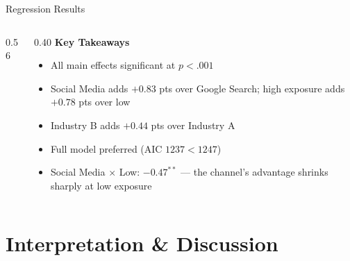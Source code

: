 \documentclass[aspectratio=169, 10pt]{beamer}
\begin{document}
\begin{frame}{Regression Results}
\begin{columns}[T]
\begin{column}{0.56\textwidth}
    \end{column}
    \begin{column}{0.40\textwidth}
      \textbf{Key Takeaways}
      \vspace{0.4em}
      \begin{itemize}
        \setlength\itemsep{0.45em}
        \item All main effects significant at $p < .001$
        \item Social Media adds $+0.83$ pts over Google Search; high exposure adds $+0.78$ pts over low
        \item Industry B adds $+0.44$ pts over Industry A
        \item Full model preferred (AIC $1237 < 1247$)
        \item Social Media $\times$ Low: $-0.47^{**}$ — the channel's advantage shrinks sharply at low exposure
      \end{itemize}
    \end{column}
  \end{columns}
\end{frame}

\section{Interpretation \& Discussion}
\end{document}
